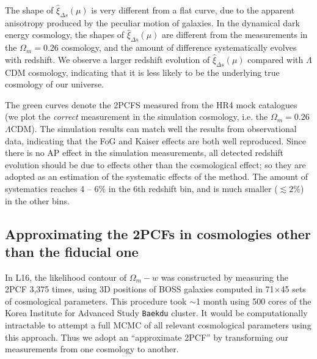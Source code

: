 \documentclass[iop]{emulateapj}
\begin{document}
The shape of $\hat \xi_{\Delta s}(\mu)$ is very different from a flat curve, 
due to the apparent anisotropy produced by the peculiar motion of galaxies.
In the dynamical dark energy cosmology, 
the shapes of $\hat\xi_{\Delta s}(\mu)$ are different from the measurements in the $\Omega_m=0.26$ cosmology,
and the amount of difference systematically evolves with redshift.
We observe a larger redshift evolution of $\hat\xi_{\Delta s}(\mu)$ compared with $\Lambda$CDM cosmology, 
indicating that it is less likely to be the underlying true cosmology of our universe.

The green curves denote the 2PCFS measured from the HR4 mock catalogues
(we plot the {\it correct} measurement in the simulation cosmology, i.e. the $\Omega_m=0.26$ $\Lambda$CDM).
The simulation results can match well the results from observational data,
indicating that the FoG \citep{FOG} and Kaiser \citep{Kaiser1987} effects are both well reproduced.
Since there is no AP effect in the simulation measurements,
all detected redshift evolution should be due to effects other than the cosmological effect; 
so they are adopted as an estimation of the systematic effects of the method.
The amount of systematics reaches 4 -- 6\% in the 6th redshift bin,
and is much smaller ($\lesssim2\%$) in the other bins.



\subsection{Approximating the 2PCFs in cosmologies other than the fiducial one}\label{sec:approx_2pcf}

In L16, the likelihood contour of $\Omega_m - w$ was constructed by
measuring the 2PCF 3,375 times,
using 3D positions of BOSS galaxies computed in 71$\times$45 sets of cosmological parameters.
This procedure took $\sim$1 month using 500 cores of the Korea Institute for Advanced Study {\texttt {Baekdu}} cluster.
It would be computationally intractable to attempt a full MCMC of all relevant cosmological parameters using this approach. 
Thus we adopt an ``approximate 2PCF'' by transforming our measurements from one cosmology to another.
\end{document}
